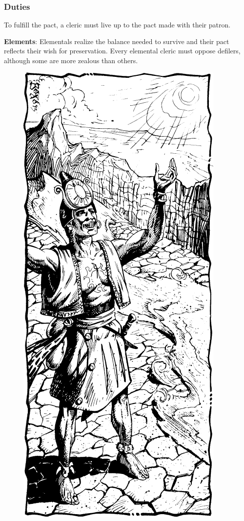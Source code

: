 \subsubsection{Duties}
To fulfill the pact, a cleric must live up to the pact made with their patron.

\textbf{Elements}: Elementals realize the balance needed to survive and their pact reflects their wish for preservation. Every elemental cleric must oppose defilers, although some are more zealous than others.

\begin{figure}[b!]
\centering
\includegraphics[width=\columnwidth]{images/cleric-3.png}

\end{figure}
